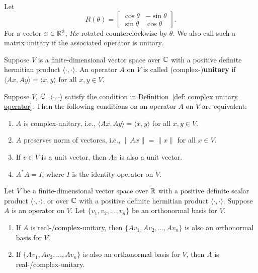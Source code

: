     \begin{exampleenv}
        Let
        $$ R(\theta) = \begin{bmatrix}
            \cos \theta & -\sin \theta \\
            \sin \theta & \cos \theta
        \end{bmatrix}. $$
        For a vector $x\in \mathbb{R}^2$, $R x$ rotated counterclockwise by $\theta$. We also call such a matrix unitary if the associated operator is unitary.
    \end{exampleenv}
    \begin{definitionenv}\label{def: complex unitary operator}
        Suppose $V$ is a finite-dimensional vector space over $\mathbb{C}$ with a positive definite hermitian product $\langle \cdot, \cdot \rangle$. An operator $A$ on $V$ is called (complex-)\textbf{unitary} if $\langle A x, A y \rangle = \langle x, y \rangle$ for all $x,y \in V$.
    \end{definitionenv}
    \begin{theoremenv}
        Suppose $V$, $\mathbb{C}$, $\langle \cdot, \cdot \rangle$ satisfy the condition in Definition~\ref{def: complex unitary operator}. Then the following conditions on an operator $A$ on $V$ are equivalent:
        \begin{enumerate}[label=(\alph*)]
            \item $A$ is complex-unitary, i.e., $\langle A x, A y \rangle = \langle x, y \rangle$ for all $x,y \in V$.
            \item $A$ preserves norm of vectores, i.e., $\|A x\| = \|x\|$ for all $x \in V$.
            \item If $v\in V$ is a unit vector, then $A v$ is also a unit vector.
            \item $A^* A = I$, where $I$ is the identity operator on $V$.
        \end{enumerate}
    \end{theoremenv}
    \begin{propositionenv}
        Let $V$ be a finite-dimensional vector space over $\mathbb{R}$ with a positive definite scalar product $\langle \cdot, \cdot \rangle$, or over $\mathbb{C}$ with a positive definite hermitian product $\langle \cdot, \cdot \rangle$. Suppose $A$ is an operator on $V$. Let $\{v_1, v_2, \ldots, v_n\}$ be an orthonormal basis for $V$.
        \begin{enumerate}[label=(\alph*)]
            \item If $A$ is real-/complex-unitary, then $\{A v_1, A v_2, \ldots, A v_n\}$ is also an orthonormal basis for $V$.
            \item If $\{A v_1, A v_2, \ldots, A v_n\}$ is also an orthonormal basis for $V$, then $A$ is real-/complex-unitary.
        \end{enumerate}
    \end{propositionenv}
